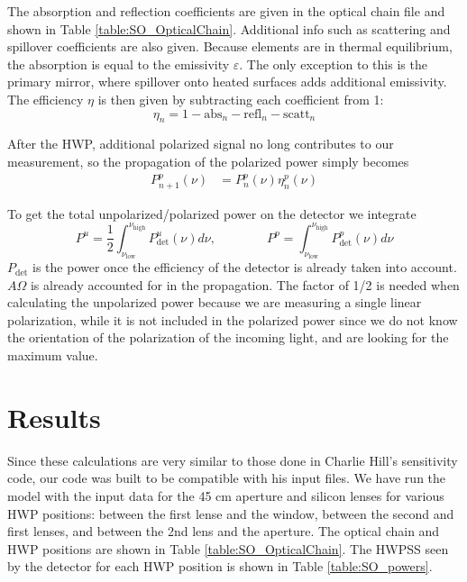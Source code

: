 \documentclass{article}
\theoremstyle{remark}
\newcommand{\tab}{\hspace*{2em}}
\renewcommand{\t}[1]{\text{#1}}
\begin{document}
\tab The absorption and reflection coefficients are given in the optical chain file and shown in Table 
\ref{table:SO_OpticalChain}. Additional info such as scattering and spillover coefficients are also given.
Because elements are in thermal equilibrium, the absorption is equal to the emissivity $\varepsilon$.
The only exception to this is the primary mirror, where spillover onto heated surfaces adds additional emissivity.
The efficiency $\eta$ is then given by subtracting each coefficient from 1:
\[\eta_n = 1 - \t{abs}_n - \t{refl}_n - \t{scatt}_n\]

\tab After the HWP, additional polarized signal no long contributes to our measurement, 
so the propagation of the polarized power simply becomes
\begin{align}
P_{n+1}^p(\nu) &=  P_n^p(\nu) \eta_n^p(\nu) 
\end{align}


To get the total unpolarized/polarized power on the detector we integrate 
\[
P^{u} = \frac{1}{2}\int_{\nu_\t{low}}^{\nu_\t{high}} P_\t{det}^u(\nu) d\nu,
\qquad \qquad
P^{p} = \int_{\nu_\t{low}}^{\nu_\t{high}} P_\t{det}^p(\nu) d\nu
\]
$P_\t{det}$ is the power once the efficiency of the detector is already taken into account. 
$A\Omega$ is already accounted for in the propagation.
The factor of 1/2 is needed when calculating the unpolarized power because we are measuring a single linear polarization,
while it is not included in the polarized power since we do not know the orientation of the polarization of the incoming light, 
and are looking for the maximum value.

\section*{Results}
\tab Since these calculations are very similar to those done in Charlie Hill's sensitivity code,
our code was built to be compatible with his input files.
We have run the model with the input data for the 45 cm aperture and silicon lenses for various HWP positions:
between the first lense and the window, between the second and first lenses, and between the 2nd lens and the aperture.
The optical chain and HWP positions are shown in Table \ref{table:SO_OpticalChain}.
The HWPSS seen by the detector for each HWP position is shown in Table \ref{table:SO_powers}.
\end{document}
